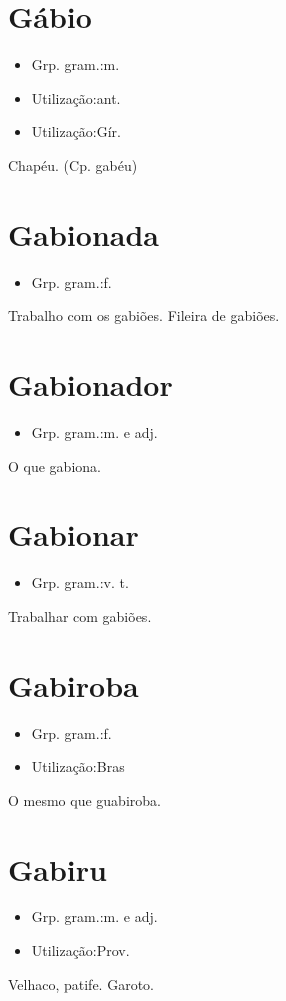 \section{Gábio}
\begin{itemize}
\item {Grp. gram.:m.}
\end{itemize}
\begin{itemize}
\item {Utilização:ant.}
\end{itemize}
\begin{itemize}
\item {Utilização:Gír.}
\end{itemize}
Chapéu.
(Cp. \textunderscore gabéu\textunderscore )
\section{Gabionada}
\begin{itemize}
\item {Grp. gram.:f.}
\end{itemize}
Trabalho com os gabiões.
Fileira de gabiões.
\section{Gabionador}
\begin{itemize}
\item {Grp. gram.:m.  e  adj.}
\end{itemize}
O que gabiona.
\section{Gabionar}
\begin{itemize}
\item {Grp. gram.:v. t.}
\end{itemize}
Trabalhar com gabiões.
\section{Gabiroba}
\begin{itemize}
\item {Grp. gram.:f.}
\end{itemize}
\begin{itemize}
\item {Utilização:Bras}
\end{itemize}
O mesmo que \textunderscore guabiroba\textunderscore .
\section{Gabiru}
\begin{itemize}
\item {Grp. gram.:m.  e  adj.}
\end{itemize}
\begin{itemize}
\item {Utilização:Prov.}
\end{itemize}
Velhaco, patife.
Garoto.
